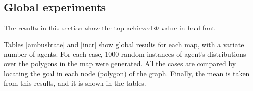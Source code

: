 \subsection{Global experiments}
\label{sec:Globals}

The results in this section show the top achieved $\Phi$ value
in bold font. 



Tables \ref{ambushrate} and \ref{incr} show global results for
each map, with a variate number of agents. For each case, 1000
random instances of agent's distributions over the polygons
in the map were generated. All the cases are compared by
locating the goal in each node (polygon) of the graph. Finally, 
the mean is taken from this results, and it is shown in the 
tables. 

